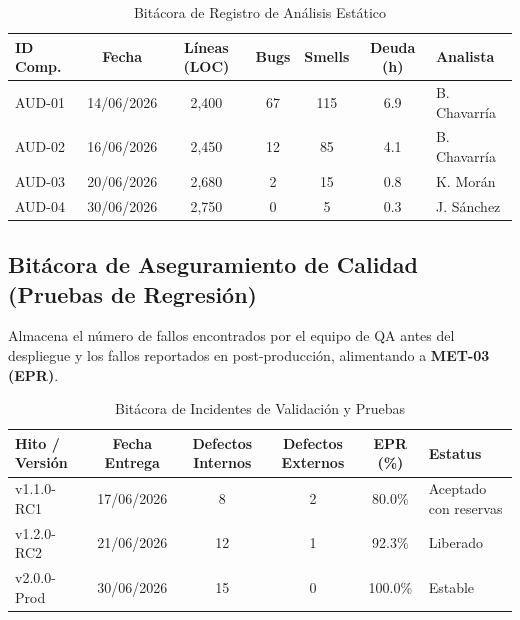 \documentclass[12pt]{article}
\begin{document}
\begin{table}[H]
    \centering\footnotesize
    \caption{Bitácora de Registro de Análisis Estático}
    \label{tab:bitacora_estatico}
    \begin{tabularx}{\textwidth}{lcccccX}
        \toprule
        \textbf{ID Comp.} & \textbf{Fecha} & \textbf{Líneas (LOC)} & \textbf{Bugs} & \textbf{Smells} & \textbf{Deuda (h)} & \textbf{Analista} \\
        \midrule
        AUD-01 & 14/06/2026 & 2,400 & 67 & 115 & 6.9 & B. Chavarría \\
        AUD-02 & 16/06/2026 & 2,450 & 12 & 85  & 4.1 & B. Chavarría \\
        AUD-03 & 20/06/2026 & 2,680 & 2  & 15  & 0.8 & K. Morán \\
        AUD-04 & 30/06/2026 & 2,750 & 0  & 5   & 0.3 & J. Sánchez \\
        \bottomrule
    \end{tabularx}
\end{table}

\subsection{Bitácora de Aseguramiento de Calidad (Pruebas de Regresión)}
Almacena el número de fallos encontrados por el equipo de QA antes del despliegue y los fallos reportados en post-producción, alimentando a \textbf{MET-03 (EPR)}.

\begin{table}[H]
    \centering\footnotesize
    \caption{Bitácora de Incidentes de Validación y Pruebas}
    \label{tab:bitacora_qa}
    \begin{tabularx}{\textwidth}{lccccX}
        \toprule
        \textbf{Hito / Versión} & \textbf{Fecha Entrega} & \textbf{Defectos Internos} & \textbf{Defectos Externos} & \textbf{EPR (\%)} & \textbf{Estatus} \\
        \midrule
        v1.1.0-RC1 & 17/06/2026 & 8 & 2 & 80.0\% & Aceptado con reservas \\
        v1.2.0-RC2 & 21/06/2026 & 12 & 1 & 92.3\% & Liberado \\
        v2.0.0-Prod & 30/06/2026 & 15 & 0 & 100.0\% & Estable \\
        \bottomrule
    \end{tabularx}
\end{table}

\newpage

\end{document}
